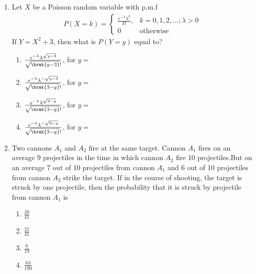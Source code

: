 \renewcommand{\theequation}{\theenumi}
\renewcommand{\thefigure}{\theenumi}
\renewcommand{\thetable}{\theenumi}
\begin{enumerate}[label=\thesection.\arabic*.,ref=\thesection.\theenumi]

\item Let $X$ be a Poisson random variable with p.m.f
\begin{align}
\label{eq:1}
P(X=k) = 
    \begin{cases} 
      \frac{e^{-\lambda}\lambda^{k}}{k!},& k=0,1,2,...;  \lambda > 0\\
      0 & \text{otherwise}
   \end{cases}
\end{align}
If $Y = X^2 + 3$, then what is $P(Y=y)$ equal to?
\begin{enumerate}[label={(\Alph*)}]
    \item $\frac{e^{-\lambda}\lambda^{\sqrt{y-3}}}{\sqrt{\brak{y-3}}!}$, for $y =$ 
    \item $\frac{e^{-\lambda}\lambda^{-\sqrt{y-3}}}{\sqrt{\brak{3-y}}!}$, for $y =$ 
    \item $\frac{e^{-\lambda}\lambda^{\sqrt{3-y}}}{\sqrt{\brak{3-y}}!}$, for $y =$ 
    \item $\frac{e^{-\lambda}\lambda^{-\sqrt{3-y}}}{\sqrt{\brak{3-y}}!}$, for $y =$ 
\end{enumerate}
%
\solution
%
%
\item Two cannons $A_{1}$ and $A_{2}$ fire at the same target. Cannon $A_{1}$ fires on an average 9 projectiles in the time in which cannon $A_{2}$ fire 10 projectiles.But on an average 7 out of 10 projectiles from cannon $A_{1}$ and 6 out of 10 projectiles from cannon $A_{2}$ strike the target. If in the course of shooting, the target is struck by one projectile, then the probability that it is struck by projectile from cannon $A_{1}$ is 
\begin{enumerate}
   \item  $\frac{20}{41}$\\
   \item  $\frac{21}{41}$ \\ 
   \item  $\frac{6}{19}$ \\
   \item  $\frac{63}{190}$ \\ 
\end{enumerate}
%
\solution

\end{enumerate}
